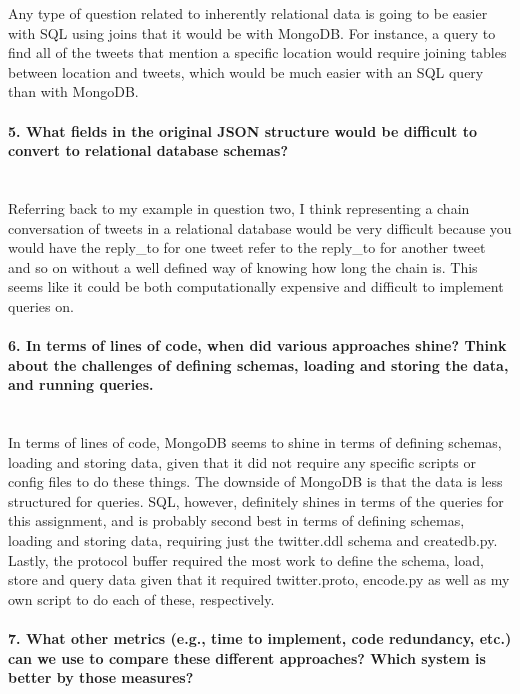 \documentclass[12pt]{article}
\begin{document}
Any type of question related to inherently relational data is going to be easier with SQL using joins that it would be with MongoDB. For instance, a query to find all of the tweets that mention a specific location would require joining tables between location and tweets, which would be much easier with an SQL query than with MongoDB. 

\paragraph{5. What fields in the original JSON structure would be difficult to convert to relational database schemas?}\mbox{}\\

Referring back to my example in question two, I think representing a chain conversation of tweets in a relational database would be very difficult because you would have the reply_to for one tweet refer to the reply_to for another tweet and so on without a well defined way of knowing how long the chain is. This seems like it could be both computationally expensive and difficult to implement queries on. 

\paragraph{6. In terms of lines of code, when did various approaches shine? Think about the challenges of defining schemas, loading and storing the data, and running queries.}\mbox{}\\

In terms of lines of code, MongoDB seems to shine in terms of defining schemas, loading and storing data, given that it did not require any specific scripts or config files to do these things. The downside of MongoDB is that the data is less structured for queries. SQL, however, definitely shines in terms of the queries for this assignment, and is probably second best in terms of defining schemas, loading and storing data, requiring just the twitter.ddl schema and createdb.py. Lastly, the protocol buffer required the most work to define the schema, load, store and query data given that it required twitter.proto, encode.py as well as my own script to do each of these, respectively.   

\paragraph{7. What other metrics (e.g., time to implement, code redundancy, etc.) can we use to compare these different approaches? Which system is better by those measures?}\mbox{}\\
\end{document}

